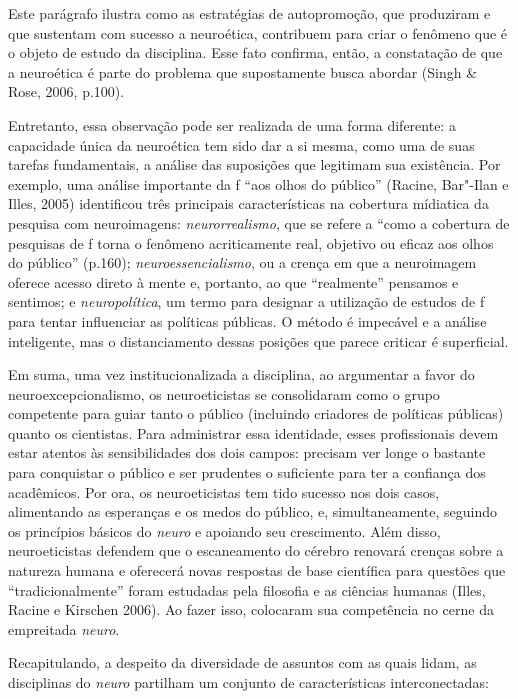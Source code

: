Este parágrafo ilustra como as estratégias de autopromoção, que
produziram e que sustentam com sucesso a neuroética, contribuem para
criar o fenômeno que é o objeto de estudo da disciplina. Esse fato
confirma, então, a constatação de que a neuroética é parte do problema
que supostamente busca abordar (Singh \& Rose, 2006, p.100).

Entretanto, essa observação pode ser realizada de uma forma diferente: a
capacidade única da neuroética tem sido dar a si mesma, como uma de suas
tarefas fundamentais, a análise das suposições que legitimam sua
existência. Por exemplo, uma análise importante da f ``aos olhos do
público'' (Racine, Bar"-Ilan e Illes, 2005) identificou três principais
características na cobertura mídiatica da pesquisa com neuroimagens:
\emph{neurorrealismo}, que se refere a ``como a cobertura de pesquisas
de f torna o fenômeno acriticamente real, objetivo ou eficaz aos
olhos do público'' (p.160); \emph{neuroessencialismo}, ou a crença em
que a neuroimagem oferece acesso direto à mente e, portanto, ao que
``realmente'' pensamos e sentimos; e \emph{neuropolítica}, um termo para
designar a utilização de estudos de f para tentar influenciar as
políticas públicas. O método é impecável e a análise inteligente, mas o
distanciamento dessas posições que parece criticar é superficial.

Em suma, uma vez institucionalizada a disciplina, ao argumentar a favor
do neuroexcepcionalismo, os neuroeticistas se consolidaram como o grupo
competente para guiar tanto o público (incluindo criadores de políticas
públicas) quanto os cientistas. Para administrar essa identidade, esses
profissionais devem estar atentos às sensibilidades dos dois campos:
precisam ver longe o bastante para conquistar o público e ser prudentes
o suficiente para ter a confiança dos acadêmicos. Por ora, os
neuroeticistas tem tido sucesso nos dois casos, alimentando as
esperanças e os medos do público, e, simultaneamente, seguindo os
princípios básicos do \emph{neuro} e apoiando seu crescimento. Além
disso, neuroeticistas defendem que o escaneamento do cérebro renovará
crenças sobre a natureza humana e oferecerá novas respostas de base
científica para questões que ``tradicionalmente'' foram estudadas pela
filosofia e as ciências humanas (Illes, Racine e Kirschen 2006). Ao
fazer isso, colocaram sua competência no cerne da empreitada
\emph{neuro}.

Recapitulando, a despeito da diversidade de assuntos com as quais lidam,
as disciplinas do \emph{neuro} partilham um conjunto de características
interconectadas:

